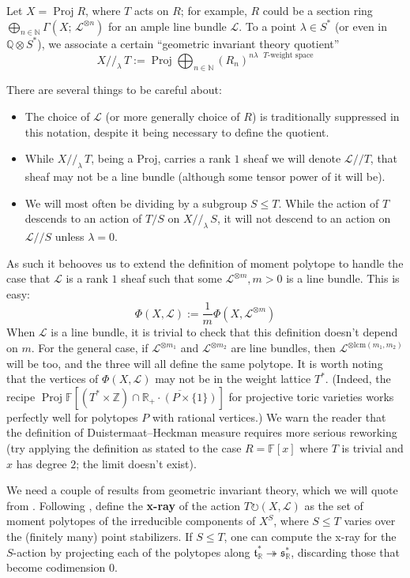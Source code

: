 \documentclass[11pt]{amsart}
\theoremstyle{definition}
\DeclareMathOperator{\Proj}{Proj}
\newcommand{\RR}{\mathbb{R}}
\newcommand{\ZZ}{\mathbb{Z}}
\newcommand{\NN}{\mathbb{N}}
\newcommand\defn[1]{{\bf #1}}
\newcommand\Oplus\bigoplus
\newcommand\lie[1]{{\mathfrak #1}}
\newcommand\FF{{\mathbb F}}
\newcommand\QQ{{\mathbb Q}}
\newcommand\tensor\otimes
\newcommand\calL{{\mathcal L}}
\newcommand\onto\twoheadrightarrow
\newcommand\junk[1]{}
\newcommand\actson\circlearrowright
\begin{document}
Let $X = \Proj R$, where $T$ acts on $R$; for example, $R$ could be
a section ring $\Oplus_{n\in\NN} \Gamma(X;\, \calL^{\tensor n})$ for an
ample line bundle $\calL$.
To a point $\lambda \in S^*$ (or even in $\QQ\tensor S^*$), 
we associate a certain ``geometric invariant theory quotient''
\[ X//_\lambda\, T := \Proj \Oplus_{n\in\NN} (R_n)^{\text{$n\lambda$ $T$-weight space}} \]
\junk{
  carrying a $T/S$-action. (The definition doesn't depend on the larger
  torus $T$ containing $S$, but we will most often use it in the setting
  where there is a larger torus.) }
There are several things to be careful about:
\begin{itemize}
\item The choice of $\calL$ (or more generally choice of $R$) is
  traditionally suppressed in this notation, despite it being
  necessary to define the quotient.
\item While $X//_\lambda\, T$, being a $\mathrm{Proj}$, carries a rank $1$ sheaf
  we will denote $\calL // T$,
  that sheaf may not be a line bundle (although some tensor power of it
  will be). 
\item We will most often be dividing by a subgroup $S\leq T$.
  While the action of $T$ descends to an action of $T/S$ on
  $X//_\lambda\, S$, it will not descend to an action on $\calL//S$
  unless $\lambda = 0$.
\end{itemize}
As such it behooves us to extend the definition of moment polytope
to handle the case that $\calL$ is a rank $1$ sheaf such that
some $\calL^{\tensor m}, m>0$ is a line bundle. This is easy:
\[ \Phi(X,\calL) := \frac{1}{m} \Phi(X,\calL^{\tensor m}) \]
When $\calL$ is a line bundle,
it is trivial to check that this definition doesn't depend on $m$.
For the general case, if $\calL^{\tensor m_1}$ and $\calL^{\tensor m_2}$ are
line bundles, then $\calL^{\tensor \mathrm{lcm}(m_1,m_2)}$ will be too,
and the three will all define the same polytope. It is worth noting
that the vertices of $\Phi(X,\calL)$ may not be in the weight lattice $T^*$.
(Indeed, the recipe $\Proj \FF\left[(T^* \times \ZZ) \cap
  \overline{\RR_+\cdot (P \times \{1\})}\right]$ for projective toric varieties
works perfectly well for polytopes $P$ with rational vertices.)
We warn the reader that the definition of Duistermaat--Heckman measure
requires more serious reworking (try applying the definition as stated
to the case $R = \FF[x]$ where $T$ is trivial and $x$ has degree $2$;
the limit doesn't exist).

We need a couple of results from geometric invariant theory, which
we will quote from \cite{brion1990action,dolgachev1998variation}.
Following \cite{tolman1998examples},
define the \defn{x-ray} of the action $T\actson (X,\calL)$ as the set
of moment polytopes of the irreducible components of $X^S$, where $S \leq T$
varies over the (finitely many) point stabilizers.
If $S\leq T$, one can compute the x-ray for the $S$-action
by projecting each of the polytopes along $\lie t^*_\RR \onto \lie s^*_\RR$,
discarding those that become codimension $0$. 
\end{document}
